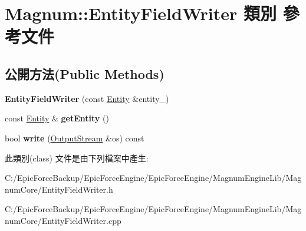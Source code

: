 \hypertarget{class_magnum_1_1_entity_field_writer}{}\section{Magnum\+:\+:Entity\+Field\+Writer 類別 參考文件}
\label{class_magnum_1_1_entity_field_writer}
\subsection*{公開方法(Public Methods)}
\begin{DoxyCompactItemize}
\item 
{\bfseries Entity\+Field\+Writer} (const \hyperlink{class_magnum_1_1_entity}{Entity} \&entity\+\_\+)\hypertarget{class_magnum_1_1_entity_field_writer_aba705d51a901a6424d40d4c49b7961a5}{}\label{class_magnum_1_1_entity_field_writer_aba705d51a901a6424d40d4c49b7961a5}

\item 
const \hyperlink{class_magnum_1_1_entity}{Entity} \& {\bfseries get\+Entity} ()\hypertarget{class_magnum_1_1_entity_field_writer_a6281389d8f6bc685e7f023eed8b06c98}{}\label{class_magnum_1_1_entity_field_writer_a6281389d8f6bc685e7f023eed8b06c98}

\item 
bool {\bfseries write} (\hyperlink{class_magnum_1_1_output_stream}{Output\+Stream} \&os) const \hypertarget{class_magnum_1_1_entity_field_writer_a3b9e3d3cea06ac696c330462f80610f5}{}\label{class_magnum_1_1_entity_field_writer_a3b9e3d3cea06ac696c330462f80610f5}

\end{DoxyCompactItemize}


此類別(class) 文件是由下列檔案中產生\+:\begin{DoxyCompactItemize}
\item 
C\+:/\+Epic\+Force\+Backup/\+Epic\+Force\+Engine/\+Epic\+Force\+Engine/\+Magnum\+Engine\+Lib/\+Magnum\+Core/Entity\+Field\+Writer.\+h\item 
C\+:/\+Epic\+Force\+Backup/\+Epic\+Force\+Engine/\+Epic\+Force\+Engine/\+Magnum\+Engine\+Lib/\+Magnum\+Core/Entity\+Field\+Writer.\+cpp\end{DoxyCompactItemize}

